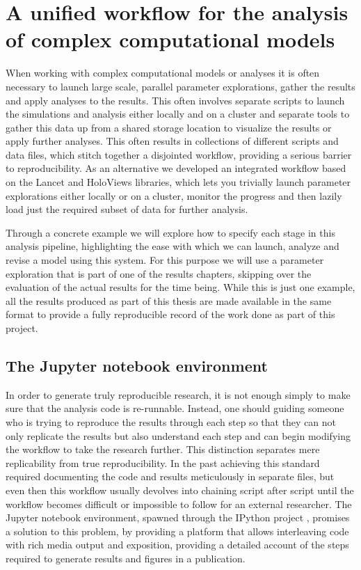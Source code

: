 \section{A unified workflow for the analysis of complex computational models}

When working with complex computational models or analyses it is often
necessary to launch large scale, parallel parameter explorations,
gather the results and apply analyses to the results. This often
involves separate scripts to launch the simulations and analysis
either locally and on a cluster and separate tools to gather this data
up from a shared storage location to visualize the results or apply
further analyses. This often results in collections of different
scripts and data files, which stitch together a disjointed workflow,
providing a serious barrier to reproducibility. As an alternative we
developed an integrated workflow based on the Lancet and HoloViews
libraries, which lets you trivially launch parameter explorations
either locally or on a cluster, monitor the progress and then lazily
load just the required subset of data for further analysis.

Through a concrete example we will explore how to specify each stage in
this analysis pipeline, highlighting the ease with which we can
launch, analyze and revise a model using this system. For this purpose
we will use a parameter exploration that is part of one of the results
chapters, skipping over the evaluation of the actual results for the
time being. While this is just one example, all the results produced
as part of this thesis are made available in the same format to
provide a fully reproducible record of the work done as part of this
project.

\subsection{The Jupyter notebook environment}

In order to generate truly reproducible research, it is not enough
simply to make sure that the analysis code is re-runnable. Instead,
one should guiding someone who is trying to reproduce the results through each
step so that they can not only replicate the results but also understand
each step and can begin modifying the workflow to take the
research further. This distinction separates mere replicability
from true reproducibility. In the past achieving this standard required documenting the
code and results meticulously in separate files, but even then this
workflow usually devolves into chaining script after script until the
workflow becomes difficult or impossible to follow for an external
researcher. The Jupyter notebook environment, spawned through the
IPython project \citep{Perez2007}, promises a solution to this problem,
by providing a platform that allows interleaving code with rich media
output and exposition, providing a detailed account of the steps
required to generate results and figures in a publication.

